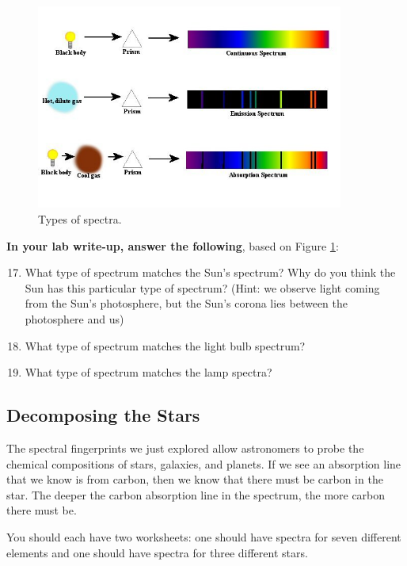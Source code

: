 \documentclass[11pt]{article}
\begin{document}
\begin{figure}[h!]
    \centering
    \includegraphics[width=0.9\textwidth,trim={0cm 2cm 0cm 1cm},clip]{Images/emission_v_absorption.jpg}
    \caption{Types of spectra.}
    \label{fig:types}
\end{figure}

\medskip 
\textbf{In your lab write-up, answer the following}, based on Figure \ref{fig:types}:
\begin{enumerate}
    \setcounter{enumi}{16}
    
    \item What type of spectrum matches the Sun's spectrum? Why do you think the Sun has this particular type of spectrum? (Hint: we observe light coming from the Sun's photosphere, but the Sun's corona lies between the photosphere and us)
    
    \item What type of spectrum matches the light bulb spectrum?
    
    \item What type of spectrum matches the lamp spectra?
\end{enumerate}


\subsection{Decomposing the Stars}
The spectral fingerprints we just explored allow astronomers to probe the chemical compositions of stars, galaxies, and planets. If we see an absorption line that we know is from carbon, then we know that there must be carbon in the star. The deeper the carbon absorption line in the spectrum, the more carbon there must be.

\medskip \noindent
You should each have two worksheets: one should have spectra for seven different elements and one should have spectra for three different stars. 
\end{document}
